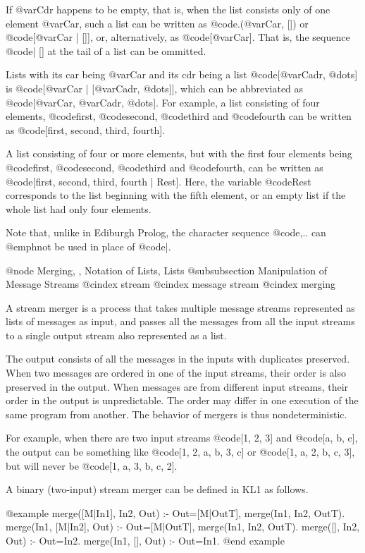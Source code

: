 {{If @var{Cdr} happens to be empty, that is, when the list consists only
of one element @var{Car}, such a list can be written as
@code{.(@var{Car}, [])} or @code{[@var{Car} | []]}, or, alternatively,
as @code{[@var{Car}]}.  That is, the sequence @code{| []} at the tail of
a list can be ommitted.

Lists with its car being @var{Car} and its cdr being a list
@code{[@var{Cadr}, @dots{}]} is @code{[@var{Car} | [@var{Cadr},
@dots{}]]}, which can be abbreviated as @code{[@var{Car}, @var{Cadr},
@dots{}]}.  For example, a list consisting of four elements, @code{first},
@code{second}, @code{third} and @code{fourth} can be written as @code{[first,
second, third, fourth]}.

A list consisting of four or more elements, but with the first four
elements being @code{first}, @code{second}, @code{third} and
@code{fourth}, can be written as @code{[first, second, third, fourth |
Rest]}.  Here, the variable @code{Rest} corresponds to the list
beginning with the fifth element, or an empty list if the whole list
had only four elements.

Note that, unlike in Ediburgh Prolog, the character sequence @code{,..}
can @emph{not} be used in place of @code{|}.

@node Merging,  , Notation of Lists, Lists
@subsubsection Manipulation of Message Streams
@cindex stream
@cindex message stream
@cindex merging

A stream merger is a process that takes multiple message streams
represented as lists of messages as input, and passes all the messages
from all the input streams to a single output stream also represented as
a list.

The output consists of all the messages in the inputs with duplicates
preserved.  When two messages are ordered in one of the input streams,
their order is also preserved in the output.  When messages are from
different input streams, their order in the output is unpredictable.
The order may differ in one execution of the same program from
another.  The behavior of mergers is thus nondeterministic.

For example, when there are two input streams @code{[1, 2, 3]} and
@code{[a, b, c]}, the output can be something like @code{[1, 2, a, b, 3,
c]} or @code{[1, a, 2, b, c, 3]}, but will never be @code{[1, a, 3, b,
c, 2]}.

A binary (two-input) stream merger can be defined in KL1 as follows.

@example
merge([M|In1], In2, Out) :- Out=[M|OutT],  merge(In1, In2, OutT).
merge(In1, [M|In2], Out) :- Out=[M|OutT],  merge(In1, In2, OutT).
merge([], In2, Out) :- Out=In2.
merge(In1, [], Out) :- Out=In1.
@end example

}}
